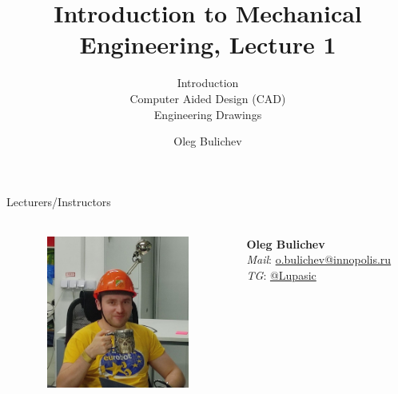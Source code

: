 \documentclass[aspectratio=169]{beamer}
\title[IME]{Introduction to Mechanical Engineering, Lecture 1} %
\subtitle{Introduction  
\\ Computer Aided Design (CAD) \\ Engineering Drawings } %
\author{Oleg Bulichev}
\newcommand{\fbckg}[1]{\usebackgroundtemplate{\texttt{[image: \#1]}}}%
\begin{document}
\setlength{\abovedisplayskip}{0pt}
\setlength{\belowdisplayskip}{0pt}
\setlength{\abovedisplayshortskip}{0pt}
\setlength{\belowdisplayshortskip}{0pt}

\fbckg{fibeamer/figs/title_page.png}

\fbckg{fibeamer/figs/common.png}

\note{\scriptsize \begin{itemize}
        \item \
    \end{itemize}}

\begin{frame}[t]{Lecturers/Instructors}
    \framesubtitle{}
    \begin{columns}[T,onlytextwidth]
        \begin{column}{0.49\textwidth}
            \begin{figure}[H]
                \centering\includegraphics[height=5cm,width=1\textwidth,keepaspectratio]{Oleg.jpg}
                \label{fig:Oleg.jpg}
            \end{figure}
        \end{column}
        \begin{column}{0.49\textwidth}
            \Large
            \vspace{2cm}
            \centering
            \textbf{Oleg Bulichev} \\
            \textit{Mail}: \url{o.bulichev@innopolis.ru}\\
            \textit{TG}: \url{@Lupasic}
        \end{column}
    \end{columns}
\end{frame}
\end{document}
